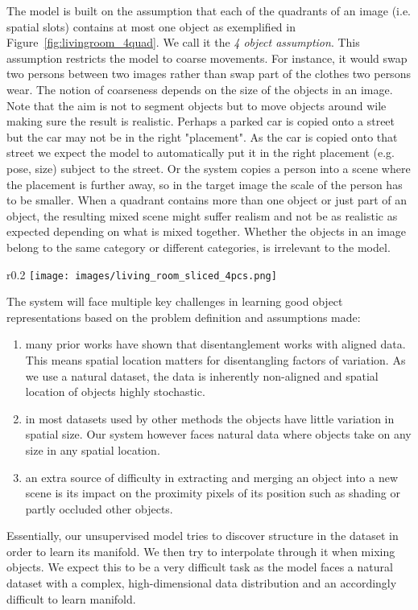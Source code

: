 \documentclass[12pt,a4paper]{article}
\begin{document}
The model is built on the assumption that each of the quadrants of an image (i.e. spatial slots) contains at most one object as exemplified in Figure~\ref{fig:livingroom_4quad}. We call it the \textit{4 object assumption}. This assumption restricts the model to coarse movements. For instance, it would swap two persons between two images rather than swap part of the clothes two persons wear. The notion of coarseness depends on the size of the objects in an image. Note that the aim is not to segment objects but to move objects around wile making sure the result is realistic. Perhaps a parked car is copied onto a street but the car may not be in the right "placement". As the car is copied onto that street we expect the model to automatically put it in the right placement (e.g. pose, size) subject to the street. Or the system copies a person into a scene where the placement is further away, so in the target image the scale of the person has to be smaller. When a quadrant contains more than one object or just part of an object, the resulting mixed scene might suffer realism and not be as realistic as expected depending on what is mixed together. Whether the objects in an image belong to the same category or different categories, is irrelevant to the model.

\begin{wrapfigure}{r}{0.2\textwidth}
\texttt{[image: images/living\_room\_sliced\_4pcs.png]} 
\caption{An image split into quadrants.} %
\label{fig:livingroom_4quad}
\end{wrapfigure}

The system will face multiple key challenges in learning good object representations based on the problem definition and assumptions made:
\begin{enumerate}
  \item many prior works have shown that disentanglement works with aligned data. This means spatial location matters for disentangling factors of variation. As we use a natural dataset, the data is inherently non-aligned and spatial location of objects highly stochastic.
  \item  in most datasets used by other methods the objects have little variation in spatial size. Our system however faces natural data where objects take on any size in any spatial location.
  \item an extra source of difficulty in extracting and merging an object into a new scene is its impact on the proximity pixels of its position such as shading or partly occluded other objects.
\end{enumerate}
Essentially, our unsupervised model tries to discover structure in the dataset in order to learn its manifold. We then try to interpolate through it when mixing objects. We expect this to be a very difficult task as the model faces a natural dataset with a complex, high-dimensional data distribution and an accordingly difficult to learn manifold. 
\end{document}
